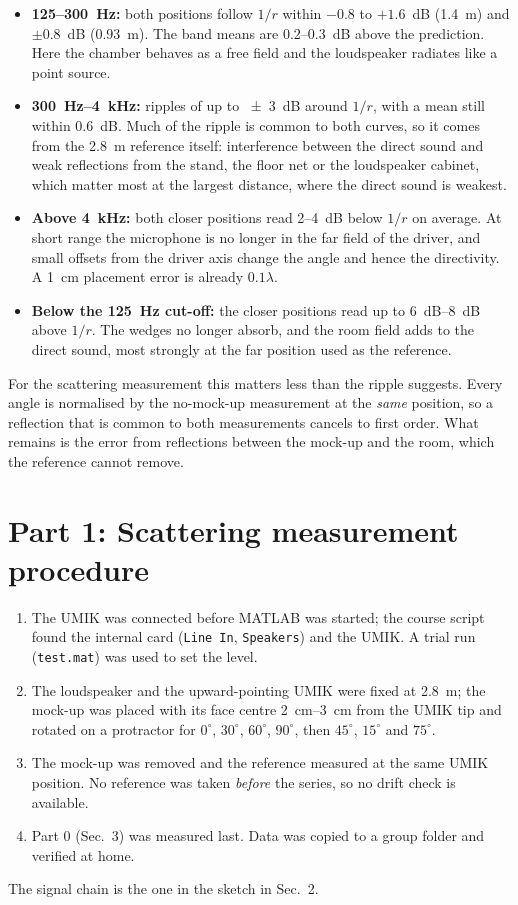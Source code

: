 \documentclass[a4paper,10pt]{article}
\newcommand{\file}[1]{\nolinkurl{#1}}
\begin{document}
\begin{itemize}
\item \textbf{125--\SI{300}{Hz}:} both positions follow $1/r$ within
$-0.8$ to $+1.6$~dB (\SI{1.4}{m}) and $\pm0.8$~dB (\SI{0.93}{m}). The band means are
0.2--\SI{0.3}{dB} above the prediction. Here the chamber behaves as a free field and the
loudspeaker radiates like a point source.
\item \textbf{\SI{300}{Hz}--\SI{4}{kHz}:} ripples of up to \SI{\pm3}{dB} around $1/r$,
with a mean still within \SI{0.6}{dB}. Much of the ripple is common to both curves, so it
comes from the \SI{2.8}{m} reference itself: interference between the direct sound and
weak reflections from the stand, the floor net or the loudspeaker cabinet, which matter
most at the largest distance, where the direct sound is weakest.
\item \textbf{Above \SI{4}{kHz}:} both closer positions read 2--\SI{4}{dB} below $1/r$
on average. At short range the microphone is no longer in the far field of the driver,
and small offsets from the driver axis change the angle and hence the directivity. A
\SI{1}{cm} placement error is already $0.1\lambda$.
\item \textbf{Below the \SI{125}{Hz} cut-off:} the closer positions read up to
\SIrange{6}{8}{dB} above $1/r$. The wedges no longer absorb, and the room field adds to
the direct sound, most strongly at the far position used as the reference.
\end{itemize}
For the scattering measurement this matters less than the ripple suggests. Every angle is
normalised by the no-mock-up measurement at the \emph{same} position, so a reflection
that is common to both measurements cancels to first order. What remains is the error
from reflections between the mock-up and the room, which the reference cannot remove.

\section{Part 1: Scattering measurement procedure}
\begin{enumerate}
\item The UMIK was connected before MATLAB was started; the course script found the
internal card (\texttt{Line In}, \texttt{Speakers}) and the UMIK. A trial run
(\file{test.mat}) was used to set the level.
\item The loudspeaker and the upward-pointing UMIK were fixed at \SI{2.8}{m}; the
mock-up was placed with its face centre \SIrange{2}{3}{cm} from the UMIK tip and
rotated on a protractor for $0^\circ$, $30^\circ$, $60^\circ$, $90^\circ$, then
$45^\circ$, $15^\circ$ and $75^\circ$.
\item The mock-up was removed and the reference measured at the same UMIK position.
No reference was taken \emph{before} the series, so no drift check is available.
\item Part 0 (Sec.~3) was measured last. Data was copied to a group folder and
verified at home.
\end{enumerate}
The signal chain is the one in the sketch in Sec.~2.
\end{document}
